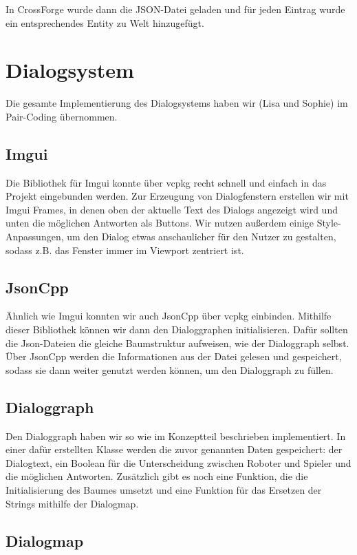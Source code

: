 In CrossForge wurde dann die JSON-Datei geladen und für jeden Eintrag wurde ein entsprechendes Entity zu Welt hinzugefügt.

\section{Dialogsystem}

Die gesamte Implementierung des Dialogsystems haben wir (Lisa und Sophie) im Pair-Coding übernommen. 

\subsection{Imgui}

Die Bibliothek für Imgui konnte über vcpkg recht schnell und einfach in das Projekt eingebunden werden. Zur Erzeugung von Dialogfenstern erstellen wir mit Imgui Frames, in denen oben der aktuelle Text des Dialogs angezeigt wird und unten die möglichen Antworten als Buttons. Wir nutzen außerdem einige Style-Anpassungen, um den Dialog etwas anschaulicher für den Nutzer zu gestalten, sodass z.B. das Fenster immer im Viewport zentriert ist.

\subsection{JsonCpp}

Ähnlich wie Imgui konnten wir auch JsonCpp über vcpkg einbinden. Mithilfe dieser Bibliothek können wir dann den Dialoggraphen initialisieren. Dafür sollten die Json-Dateien die gleiche Baumstruktur aufweisen, wie der Dialoggraph selbst. Über JsonCpp werden die Informationen aus der Datei gelesen und gespeichert, sodass sie dann weiter genutzt werden können, um den Dialoggraph zu füllen.

\subsection{Dialoggraph}

Den Dialoggraph haben wir so wie im Konzeptteil beschrieben implementiert. In einer dafür erstellten Klasse werden die zuvor genannten Daten gespeichert: der Dialogtext, ein Boolean für die Unterscheidung zwischen Roboter und Spieler und die möglichen Antworten. Zusätzlich gibt es noch eine Funktion, die die Initialisierung des Baumes umsetzt und eine Funktion für das Ersetzen der Strings mithilfe der Dialogmap.

\subsection{Dialogmap}

